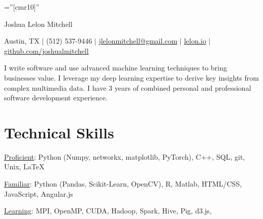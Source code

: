 \documentclass[a4paper,10pt]{article}
\begin{document}

\pagestyle{empty} %

\font\fb=''[cmr10]'' %

\par{\centering
		{\Huge Joshua Lelon Mitchell
	}\par}
\par{\centering
		{
	Austin, TX
	$\mid$
	(512) 537-9446
	$\mid$
	\href {mailto:jlelonmitchell@gmail.com}{jlelonmitchell@gmail.com}
	$\mid$
	\href {http://lelon.io/blog/2018/01/04/to-potential-employers}{lelon.io}
	$\mid$
	\href {https://github.com/joshualmitchell}{github.com/joshualmitchell}
}\par}

\begin{center}
I write software and use advanced machine learning techniques to bring businesses value. I leverage my deep learning expertise to derive key insights from complex multimedia data. I have 3 years of combined personal and professional software development experience.
\end{center}

\section{Technical Skills}

\underline{Proficient}: Python (Numpy, networkx, matplotlib, PyTorch), C++, SQL, git, Unix, LaTeX

\underline{Familiar}: Python (Pandas, Scikit-Learn, OpenCV), R, Matlab, HTML/CSS, JavaScript, Angular.js

\underline{Learning}: MPI, OpenMP, CUDA, Hadoop, Spark, Hive, Pig, d3.js, 

\end{document}

